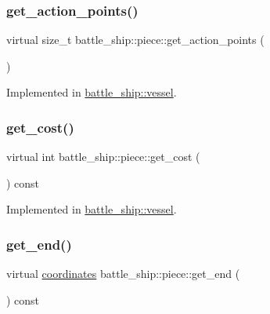 \subsubsection{\texorpdfstring{get\+\_\+action\+\_\+points()}{get\_action\_points()}}
{\footnotesize\ttfamily virtual size\+\_\+t battle\+\_\+ship\+::piece\+::get\+\_\+action\+\_\+points (\begin{DoxyParamCaption}{ }\end{DoxyParamCaption})\hspace{0.3cm}{\ttfamily [pure virtual]}}



Implemented in \hyperlink{classbattle__ship_1_1vessel_a398b4134137d9e11c13e6aee548e1802}{battle\+\_\+ship\+::vessel}.

\mbox{\label{classbattle__ship_1_1piece_a9193782bce8a697bd5d3cb391d5f1623}} 
\subsubsection{\texorpdfstring{get\+\_\+cost()}{get\_cost()}}
{\footnotesize\ttfamily virtual int battle\+\_\+ship\+::piece\+::get\+\_\+cost (\begin{DoxyParamCaption}{ }\end{DoxyParamCaption}) const\hspace{0.3cm}{\ttfamily [pure virtual]}}



Implemented in \hyperlink{classbattle__ship_1_1vessel_aadca1fe2ac265ed9f22e68490b6b22eb}{battle\+\_\+ship\+::vessel}.

\mbox{\label{classbattle__ship_1_1piece_a4f7ac17a3ba66f104d2c5110e0fe51d4}} 
\subsubsection{\texorpdfstring{get\+\_\+end()}{get\_end()}}
{\footnotesize\ttfamily virtual \hyperlink{structbattle__ship_1_1coordinates}{coordinates} battle\+\_\+ship\+::piece\+::get\+\_\+end (\begin{DoxyParamCaption}{ }\end{DoxyParamCaption}) const\hspace{0.3cm}{\ttfamily [pure virtual]}}



